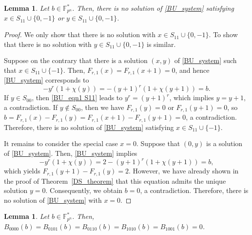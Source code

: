 \documentclass[11pt]{article}
\numberwithin{theorem}{section}
\newtheorem{lemma}[theorem]{Lemma}
\newcommand{\Fpnmul}{\mathbb{F}_{p^n}^*}
\begin{document}
\begin{lemma}\label{BU_lemma S11}
	Let $b\in \Fpnmul$. Then, there is no solution of \eqref{BU_system} satisfying $x\in S_{11}\cup\{0,-1\}$ or $y\in S_{11}\cup\{0,-1\}$. 
\end{lemma}
\begin{proof}
	We only show that there is no solution with $x\in S_{11}\cup\{0,-1\}$. To show that there is no solution with $y\in S_{11}\cup\{0,-1\}$ is similar.
	
	Suppose on the contrary that there is a solution $(x,y)$ of \eqref{BU_system} such that $x\in S_{11}\cup\{-1\}$. Then, $F_{r,1}(x)=F_{r,1}(x+1)=0$, and hence \eqref{BU_system} corresponds to 
	\begin{equation}\label{BU_eqn1 S11}
		-y^r(1+\chi(y))=-(y+1)^r(1+\chi(y+1))=b.
	\end{equation}
	If $y\in S_{00}$, then \eqref{BU_eqn1 S11} leads to $y^r =(y+1)^r$, which implies $y=y+1$, a contradiction. If $y\not \in S_{00}$, then we have $F_{r,1}(y)=0$ or $F_{r,1}(y+1)=0$, so $b = F_{r,1}(x) - F_{r,1}(y) = F_{r,1}(x+1) - F_{r,1}(y+1) = 0$, a contradiction. Therefore, there is no solution of \eqref{BU_system} satisfying $x\in S_{11}\cup\{-1\}$.
	
	It remains to consider the special case $x=0$.
	Suppose that $(0,y)$ is a solution of \eqref{BU_system}.
	Then, \eqref{BU_system} implies
	$$
	-y^r(1+\chi(y))=2-(y+1)^r(1+\chi(y+1))=b,
	$$
	which yields $F_{r,1}(y+1)-F_{r,1}(y)=2$.
	However, we have already shown in the proof of Theorem~\ref{DS_theorem}
	that this equation admits the unique solution $y=0$.
	Consequently, we obtain $b=0$, a contradiction.
	Therefore, there is no solution of \eqref{BU_system} with $x=0$.
\end{proof}



\begin{lemma}\label{BU_lemma nosol}
	Let $b\in \Fpnmul$. Then, $B_{0000}(b)=B_{0101}(b)=B_{0110}(b)=B_{1010}(b)=B_{1001}(b)=0$. 
\end{lemma}
\end{document}
